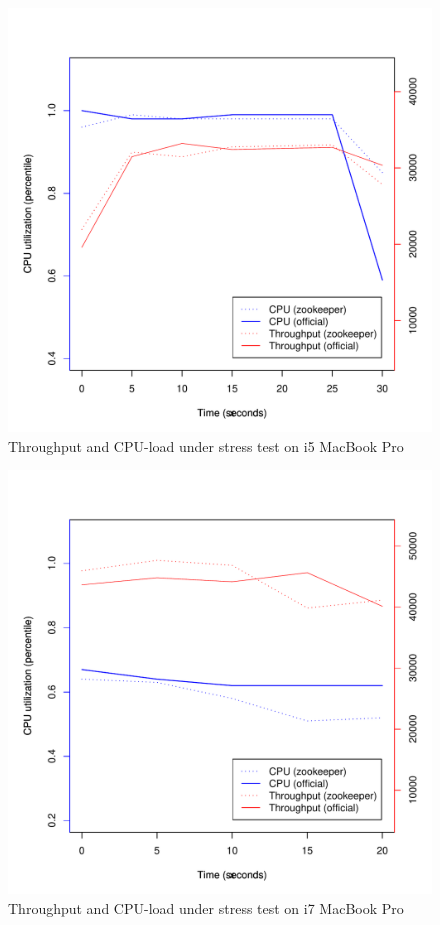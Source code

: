 \begin{figure}[h]
    \centering
    \includegraphics[width=1.0\textwidth]{results/throughput/singlenode/throughput_knut}
    \caption{Throughput and CPU-load under stress test on i5 MacBook Pro}
    \label{fig:thug_knut}
\end{figure}

\clearpage

\begin{figure}[h]
    \centering
    \includegraphics[width=1.0\textwidth]{results/throughput/singlenode/throughput_eivind}
    \caption{Throughput and CPU-load under stress test on i7 MacBook Pro}
    \label{fig:thug_eivind}
\end{figure}


